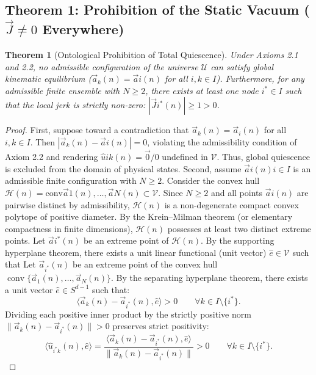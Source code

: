 \documentclass[11pt,a4paper]{article}
\theoremstyle{plain}
\newtheorem{theorem}{Theorem}[section]
\theoremstyle{definition}
\theoremstyle{remark}
\begin{document}
\subsection{Theorem 1: Prohibition of the Static Vacuum ($\vec{J} \neq 0$ Everywhere)}
\begin{theorem}[Ontological Prohibition of Total Quiescence]
\label{thm:no_quiescence}
Under Axioms 2.1 and 2.2, no admissible configuration of the universe $\mathcal{U}$ can satisfy global kinematic equilibrium ($\vec{a}_k(n) = \vec{a}i(n)$ for all $i,k \in I$). Furthermore, for any admissible finite ensemble with $N \ge 2$, there exists at least one node $i^* \in I$ such that the local jerk is strictly non-zero: $|\vec{J}{i^*}(n)| \ge 1 > 0$.
\end{theorem}
\begin{proof}
First, suppose toward a contradiction that $\vec{a}_k(n) = \vec{a}_i(n)$ for all $i,k \in I$. Then $|\vec{a}_k(n) - \vec{a}i(n)| = 0$, violating the admissibility condition of Axiom 2.2 and rendering $\hat{u}{ik}(n) = \vec{0}/0$ undefined in $\mathcal{V}$. Thus, global quiescence is excluded from the domain of physical states.
Second, assume ${\vec{a}i(n)}{i \in I}$ is an admissible finite configuration with $N \ge 2$. Consider the convex hull $\mathcal{H}(n) = \mathrm{conv}{\vec{a}1(n), \dots, \vec{a}N(n)} \subset \mathcal{V}$. Since $N \ge 2$ and all points $\vec{a}i(n)$ are pairwise distinct by admissibility, $\mathcal{H}(n)$ is a non-degenerate compact convex polytope of positive diameter. By the Krein--Milman theorem (or elementary compactness in finite dimensions), $\mathcal{H}(n)$ possesses at least two distinct extreme points. Let $\vec{a}{i^*}(n)$ be an extreme point of $\mathcal{H}(n)$. By the supporting hyperplane theorem, there exists a unit linear functional (unit vector) $\hat{e} \in \mathcal{V}$ such that
Let $\vec{a}_{i^*}(n)$ be an extreme point of the convex hull $\operatorname{conv}\{\vec{a}_1(n), \dots, \vec{a}_N(n)\}$. By the separating hyperplane theorem, there exists a unit vector $\hat{e} \in S^{d-1}$ such that:
\begin{equation}
\langle \vec{a}_k(n) - \vec{a}_{i^*}(n), \hat{e} \rangle > 0 \qquad \forall k \in I \setminus \{i^*\}.
\end{equation}
Dividing each positive inner product by the strictly positive norm $\lVert \vec{a}_k(n) - \vec{a}_{i^*}(n) \rVert > 0$ preserves strict positivity:
\begin{equation}
\langle \hat{u}_{i^* k}(n), \hat{e} \rangle = \frac{\langle \vec{a}_k(n) - \vec{a}_{i^*}(n), \hat{e} \rangle}{\lVert \vec{a}_k(n) - \vec{a}_{i^*}(n) \rVert} > 0 \qquad \forall k \in I \setminus \{i^*\}.

\end{equation}
\end{proof}
\end{document}
